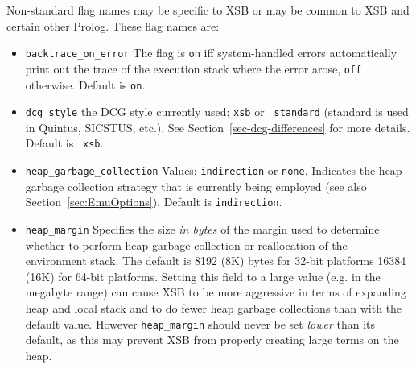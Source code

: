 \begin{description}
Non-standard flag names may be specific to XSB or may be common to XSB
and certain other Prolog.  These flag names are:
\begin{itemize}
%
\item {\tt backtrace\_on\_error} The flag is {\tt on} iff
  system-handled errors automatically print out the trace of the
  execution stack where the error arose, {\tt off} otherwise. Default
  is {\tt on}.
\item {\tt dcg\_style}  the DCG style currently used; {\tt xsb} or {\tt
  standard} (standard is used in Quintus, SICSTUS, etc.).  See
Section~\ref{sec-dcg-differences} for more details. Default is {\tt
  xsb}.
%
\item {\tt heap\_garbage\_collection} Values: {\tt indirection} or
  {\tt none}.  Indicates the heap garbage collection strategy that is
  currently being employed (see also Section~\ref{sec:EmuOptions}).
  Default is {\tt indirection}.
%
\item {\tt heap\_margin} Specifies the size {\em in bytes} of the
  margin used to determine whether to perform heap garbage collection
  or reallocation of the environment stack.  The default is 8192 (8K)
  bytes for 32-bit platforms 16384 (16K) for 64-bit platforms.
  Setting this field to a large value (e.g. in the megabyte range) can
  cause XSB to be more aggressive in terms of expanding heap and local
  stack and to do fewer heap garbage collections than with the default
  value.  However {\tt heap\_margin} should never be set {\em lower}
  than its default, as this may prevent XSB from properly creating
  large terms on the heap.


\end{itemize}
\end{description}
